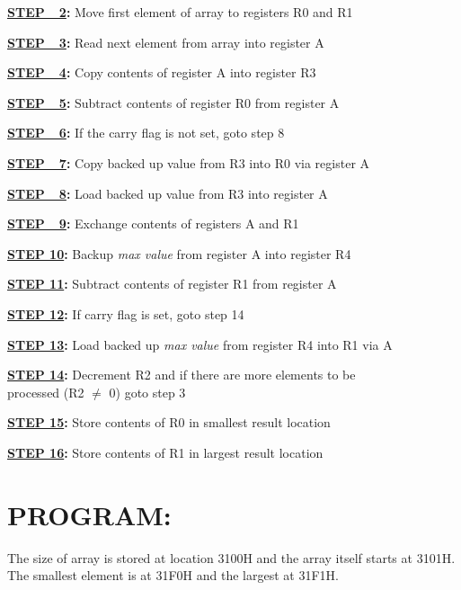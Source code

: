 \documentclass[a4paper,28pt]{report}
\begin{document}
\textbf{\underline{STEP\ \ 2}:} Move first element of array to registers R0 and R1

\textbf{\underline{STEP\ \ 3}:} Read next element from array into register A

\textbf{\underline{STEP\ \ 4}:} Copy contents of register A into register R3

\textbf{\underline{STEP\ \ 5}:} Subtract contents of register R0 from register A

\textbf{\underline{STEP\ \ 6}:} If the carry flag is not set, goto step 8

\textbf{\underline{STEP\ \ 7}:} Copy backed up value from R3 into R0 via register A

\textbf{\underline{STEP\ \ 8}:} Load backed up value from R3 into register A

\textbf{\underline{STEP\ \ 9}:} Exchange contents of registers A and R1

\textbf{\underline{STEP 10}:} Backup \emph{max value} from register A into register R4

\textbf{\underline{STEP 11}:} Subtract contents of register R1 from register A

\textbf{\underline{STEP 12}:} If carry flag is set, goto step 14

\textbf{\underline{STEP 13}:} Load backed up \emph{max value} from register R4 into R1 via A

\textbf{\underline{STEP 14}:} Decrement R2 and if there are more elements to be \\\hspace*{62pt}processed (R2 $\neq$ 0) goto step 3

\textbf{\underline{STEP 15}:} Store contents of R0 in smallest result location

\textbf{\underline{STEP 16}:} Store contents of R1 in largest result location

\section*{PROGRAM:}
The size of array is stored at location 3100H and the array itself starts at 3101H. The smallest element is at 31F0H and the largest at 31F1H.
\end{document}
